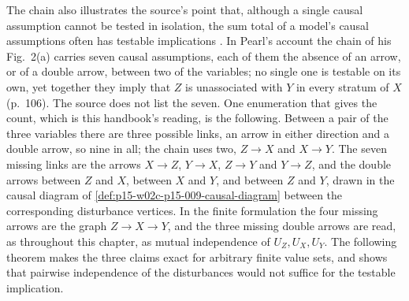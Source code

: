 The chain also illustrates the source's point that, although a single
causal assumption cannot be tested in isolation, the sum total of a
model's causal assumptions often has testable implications
\cite[sec.~3.1, p.~106]{Pearl2009CausalOverview}. In Pearl's account
the chain of his Fig.~2(a) carries seven causal assumptions, each of
them the absence of an arrow, or of a double arrow, between two of the
variables; no single one is testable on its own, yet together they
imply that \(Z\) is unassociated with \(Y\) in every stratum of \(X\)
(p.~106). The source does not list the seven. One enumeration that gives
the count, which is this handbook's reading, is the following. Between a
pair of the three variables there are three possible links, an arrow in
either direction and a double arrow, so nine in all; the chain uses two,
\(Z\to X\) and \(X\to Y\). The seven missing links are the arrows
\(X\to Z\), \(Y\to X\), \(Z\to Y\) and \(Y\to Z\), and the double
arrows between \(Z\) and \(X\), between \(X\) and \(Y\), and between
\(Z\) and \(Y\), drawn in the causal diagram of
\cref{def:p15-w02c-p15-009-causal-diagram} between the corresponding
disturbance vertices. In the finite formulation the four missing arrows
are the graph \(Z\to X\to Y\), and the three missing double arrows are
read, as throughout this chapter, as mutual independence of
\(U_Z,U_X,U_Y\). The following theorem makes the three claims exact for
arbitrary finite value sets, and shows that pairwise independence of the
disturbances would not suffice for the testable implication.

